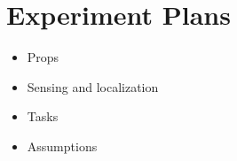 \section{Experiment Plans}
\begin{itemize}
\item Props
\item Sensing and localization
\item Tasks
\item Assumptions
\end{itemize}